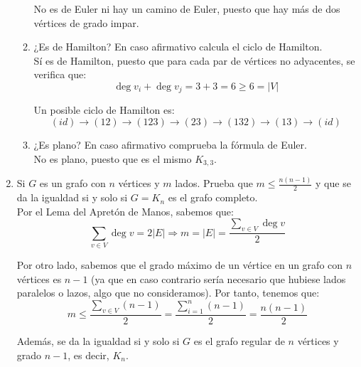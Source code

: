\begin{ejercicio}
\begin{enumerate}
\begin{enumerate}
            No es de Euler ni hay un camino de Euler, puesto que hay más de dos vértices de grado impar.
            \item ¿Es de Hamilton? En caso afirmativo calcula el ciclo de Hamilton.\\
            
            Sí es de Hamilton, puesto que para cada par de vértices no adyacentes, se verifica que:
            \begin{equation*}
                \deg v_i + \deg v_j = 3 + 3 = 6 \geq 6=|V|
            \end{equation*}

            Un posible ciclo de Hamilton es:
            \begin{equation*}
                (id)\to (12)\to (123)\to (23)\to (132)\to (13)\to (id)
            \end{equation*}
            \item ¿Es plano? En caso afirmativo comprueba la fórmula de Euler.\\
            
            No es plano, puesto que es el mismo $K_{3,3}$.
        \end{enumerate}
        \item Si $G$ es un grafo con $n$ vértices y $m$ lados. Prueba que $m \leq \frac{n(n-1)}{2}$ y que se da la igualdad si y solo si $G = K_n$ es el grafo completo.\\
        
        Por el Lema del Apretón de Manos, sabemos que:
        \begin{equation*}
            \sum_{v\in V}\deg v = 2|E|
            \Longrightarrow
            m=|E|=\dfrac{\sum\limits_{v\in V}\deg v}{2}
        \end{equation*}

        Por otro lado, sabemos que el grado máximo de un vértice en un grafo con $n$ vértices es $n-1$ (ya que en caso contrario sería necesario que hubiese lados paralelos o lazos, algo que no consideramos). Por tanto, tenemos que:
        \begin{equation*}
            m\leq \dfrac{\sum\limits_{v\in V}(n-1)}{2} = \dfrac{\sum\limits_{i=1}^n(n-1)}{2} = \dfrac{n(n-1)}{2}
        \end{equation*}

        Además, se da la igualdad si y solo si $G$ es el grafo regular de $n$ vértices y grado $n-1$, es decir, $K_n$.
    \end{enumerate}
\end{ejercicio}

